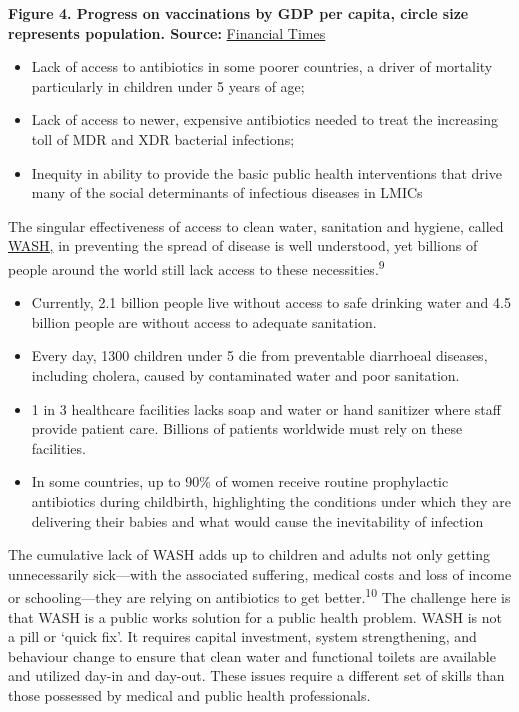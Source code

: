 \documentclass[
]{book}
\providecommand{\tightlist}{%
  \setlength{\itemsep}{0pt}\setlength{\parskip}{0pt}}
\begin{document}
\textbf{Figure 4. Progress on vaccinations by GDP per capita, circle size represents population. Source:} \href{https://www.ft.com/visual-and-data-journalism}{Financial Times}

\begin{itemize}
\tightlist
\item
  Lack of access to antibiotics in some poorer countries, a driver of mortality particularly in children under 5 years of age;
\item
  Lack of access to newer, expensive antibiotics needed to treat the increasing toll of MDR and XDR bacterial infections;
\item
  Inequity in ability to provide the basic public health interventions that drive many of the social determinants of infectious diseases in LMICs
\end{itemize}

The singular effectiveness of access to clean water, sanitation and hygiene, called \href{https://www.who.int/health-topics/water-sanitation-and-hygiene-wash}{WASH,} in preventing the spread of disease is well understood, yet billions of people around the world still lack access to these necessities.\textsuperscript{9}

\begin{itemize}
\tightlist
\item
  Currently, 2.1 billion people live without access to safe drinking water and 4.5 billion people are without access to adequate sanitation.
\item
  Every day, 1300 children under 5 die from preventable diarrhoeal diseases, including cholera, caused by contaminated water and poor sanitation.
\item
  1 in 3 healthcare facilities lacks soap and water or hand sanitizer where staff provide patient care. Billions of patients worldwide must rely on these facilities.
\item
  In some countries, up to 90\% of women receive routine prophylactic antibiotics during childbirth, highlighting the conditions under which they are delivering their babies and what would cause the inevitability of infection
\end{itemize}

The cumulative lack of WASH adds up to children and adults not only getting unnecessarily sick---with the associated suffering, medical costs and loss of income or schooling---they are relying on antibiotics to get better.\textsuperscript{10} The challenge here is that WASH is a public works solution for a public health problem. WASH is not a pill or `quick fix'. It requires capital investment, system strengthening, and behaviour change to ensure that clean water and functional toilets are available and utilized day-in and day-out. These issues require a different set of skills than those possessed by medical and public health professionals.
\end{document}
